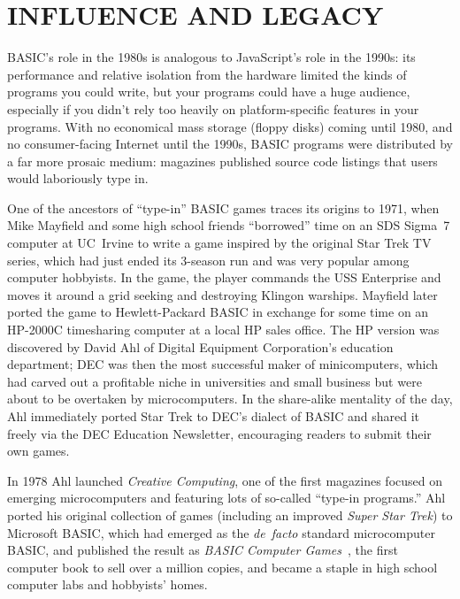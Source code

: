

\section{INFLUENCE AND LEGACY}


BASIC's role in the 1980s is analogous to JavaScript's role in the
1990s: its performance and relative isolation from the hardware limited
the kinds of programs you could write, but your programs could have a
huge audience, especially if you didn't rely too heavily on
platform-specific features in your programs.
With no economical mass storage (floppy disks) coming until 1980, and no
consumer-facing Internet until the 1990s, BASIC programs were
distributed by a far more prosaic medium: magazines published source
code listings that users would laboriously type in.

One of the ancestors of ``type-in'' BASIC games traces its origins to
1971, when Mike Mayfield and some high school friends ``borrowed'' time
on an SDS Sigma~7 computer at UC~Irvine to write a game inspired by the
original Star Trek TV series, which had just ended its 3-season run and
was very popular among computer hobbyists.
In the game, the player commands the USS Enterprise and moves it around
a grid seeking and destroying Klingon warships.
Mayfield later ported the game to Hewlett-Packard BASIC in exchange for
some time on an HP-2000C timesharing computer at a local HP sales
office.
The HP version was discovered by David Ahl of Digital Equipment
Corporation's education department; DEC was then the most successful
maker of minicomputers, which had carved out a profitable niche in
universities and small business but were about to be overtaken by
microcomputers.  In the share-alike mentality of the day, Ahl
immediately ported Star Trek to DEC's dialect of BASIC and shared it freely via the DEC
Education Newsletter, encouraging readers to submit their own games.

In 1978 Ahl launched \emph{Creative Computing}, one of the first
magazines focused on emerging microcomputers and featuring lots of
so-called ``type-in programs.''
Ahl ported his original collection of games (including an improved
\emph{Super Star Trek}) to Microsoft BASIC, which had emerged as the
\emph{de~facto} standard microcomputer BASIC, and published the result
as \emph{BASIC Computer Games}~\cite{basic_computer_games}, the first
computer book to sell over a million copies, and became a staple in high
school computer labs and hobbyists' homes.

